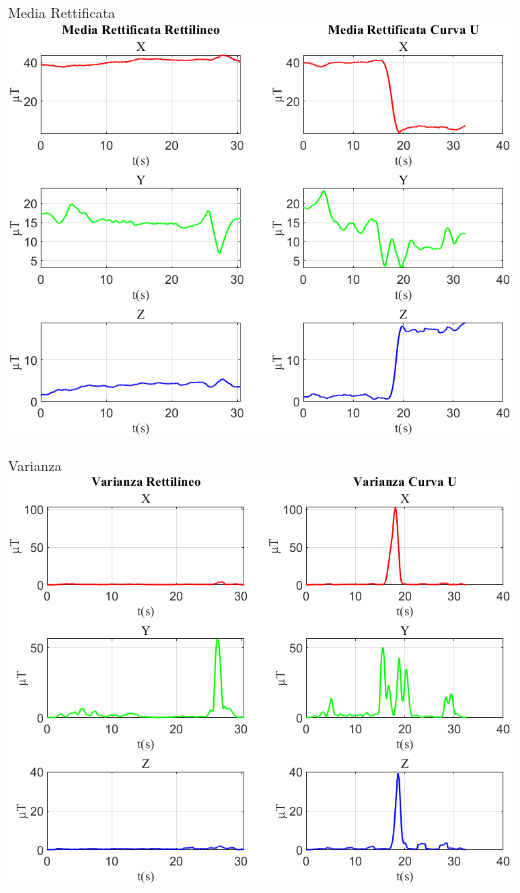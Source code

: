 \documentclass[beamer]{standalone}
\begin{document}
	\begin{frame}{{Media Rettificata}}
		\centering\includegraphics[height=.8\textheight]{figure/Mag/Media Rettificata}
	\end{frame}
	
	\begin{frame}{{Varianza}}
		\centering\includegraphics[height=.8\textheight]{figure/Mag/Varianza}
	\end{frame}
	
\end{document}
